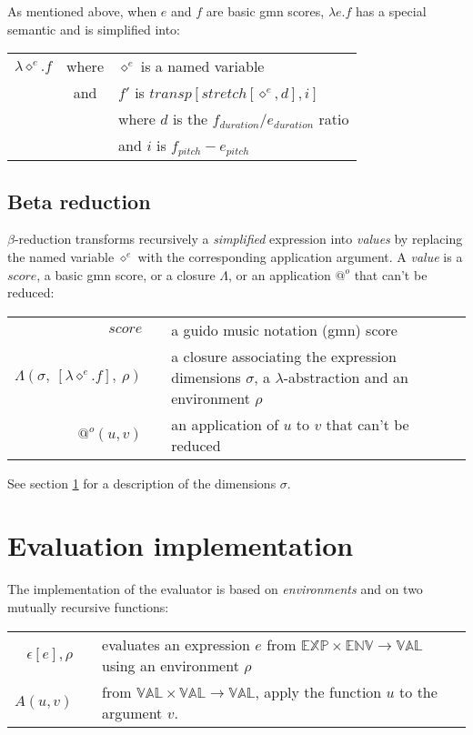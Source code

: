 \documentclass[10pt,a4paper,frenchb]{article}
\makeatletter
\newcommand{\var}[1]	{\ensuremath{\diamond^#1}}
\newcommand{\expr}		{\ensuremath{\mathbb{EXP}}}
\newcommand{\val}		{\ensuremath{\mathbb{VAL}}}
\newcommand{\env}		{\ensuremath{\mathbb{ENV}}}
\newcommand{\closure}	{\ensuremath{\Lambda}}
\newcommand{\applyop}	{\ensuremath{@}}
\newcommand{\noredex}	{\ensuremath{\applyop^o}}
\newcommand{\sdomain}[3]{$#1 \times #2 \rightarrow #3$}
\newcommand{\evalsym}			{\ensuremath{\epsilon}}
\newcommand{\envsym}			{\ensuremath{\rho}}
\newcommand{\closenv}[2][f]		{\closure(#2,\ [\lambda \var{e}.#1],\ \envsym)}
\newcommand{\evalsimple}[1]			{\evalsym\left[#1\right],\rho}
\newcommand{\lambdaexpr}	{\lambda \var{e}.f}
\newcommand{\bounds}		{\ensuremath{\sigma}}
\makeatother
\begin{document}
As mentioned above, when $e$ and $f$ are basic gmn scores, $\lambda e.f$ has a special semantic and is simplified into: 
\begin{tabular}{rcl}
 $\lambdaexpr$ & where & $\var{e}$ is a named variable \\
 	& and & $f'$ is $transp[stretch[\var{e}, d], i]$ \\
 	&  & where $d$ is the $f_{duration} / e_{duration}$ ratio \\
 	&  & and $i$ is $f_{pitch} - e_{pitch}$ \\
\end{tabular}


\subsection{Beta reduction}

$\beta$-reduction transforms recursively a \emph{simplified} expression into \emph{values} by replacing the named variable $\var{e}$ with the corresponding application argument. A \emph{value} is a $score$, a basic gmn score, or a closure $\closure$, or an application $\noredex$ that can't be reduced:
\begin{center}
\begin{tabular}{rc@{ : }l}
 $score$				& & a guido music notation (gmn) score \\
 $\closenv{\bounds}$ 	& & a closure associating the expression dimensions $\bounds$, a $\lambda$-abstraction and an environment $\envsym$ \\
 $\noredex(u,v)$ 		& & an application of $u$ to $v$ that can't be reduced \\
\end{tabular}
\end{center}

See section \ref{impl} for a description of the dimensions $\bounds$.

\section{Evaluation implementation}
\label{impl}

The implementation of the evaluator is based on \emph{environments} and on two mutually recursive functions:
\begin{center}
\begin{tabular}{rc@{ : }l}
$\evalsimple{e}$ & & evaluates an expression $e$ from \sdomain{\expr}{\env}{\val} using an environment $\envsym$ \\
$A(u,v)$  & & from \sdomain{\val}{\val}{\val}, apply the function $u$ to the argument $v$. \\
\end{tabular}
\end{center}
\end{document}
